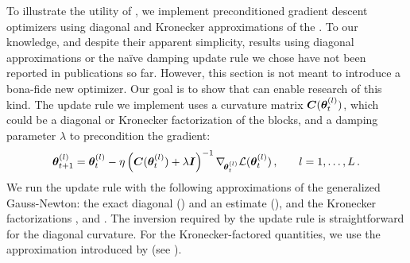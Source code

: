 To illustrate the utility of \BackPACK, we implement preconditioned gradient
descent optimizers using diagonal and Kronecker approximations of the \GGN. To
our knowledge, and despite their apparent simplicity, results using diagonal
approximations or the naïve damping update rule we chose have not been reported
in publications so far. However, this section is not meant to introduce a
bona-fide new optimizer. Our goal is to show that \BackPACK can enable research
of this kind. The update rule we implement uses a curvature matrix
${\bm{C}}({\bm{\theta}}_t^{(l)})$, which could be a diagonal or Kronecker factorization of
the \GGN blocks, and a damping parameter $\lambda$ to precondition the gradient:
\begin{equation}
  \label{backpack::eq:update_rule}
  {\bm{\theta}}_{t+1}^{(l)}
  =
  {\bm{\theta}}_t^{(l)} - \eta \left({\bm{C}}({\bm{\theta}}_t^{(l)}) + \lambda {\bm{I}}\right)^{-1}
  \nabla_{\!{{\bm{\theta}}_t^{(l)}}}\mathcal{L}({\bm{\theta}}_t^{(l)})\,{,}
  \qquad l = 1,\dots, L\,{.}
\end{equation}
We run the update rule with the following approximations of the generalized
Gauss-Newton: the exact diagonal (\DiagGGN) and an \MC estimate (\DiagGGNMC),
and the Kronecker factorizations \KFAC \citep{martens2015optimizing}, \KFLR and
\KFRA{}
\citep{botev2017practical}.%
The inversion required by the update rule is straightforward for the diagonal
curvature. For the Kronecker-factored quantities, we use the approximation
introduced by \cite{martens2015optimizing} (see
).

